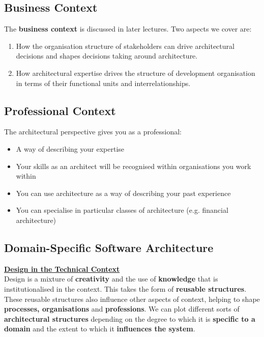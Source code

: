 \documentclass[a4paper]{article}
\begin{document}
\subsection{Business Context}
The \textbf{business context} is discussed in later lectures. Two aspects we cover are:
\begin{enumerate}
\item How the organisation structure of stakeholders can drive architectural decisions and shapes decisions taking around architecture.
\item How architectural expertise drives the structure of development organisation in terms of their functional units and interrelationships.
\end{enumerate}
\subsection{Professional Context}
The architectural perspective gives you as a professional:
\begin{itemize}
\item A way of describing your expertise
\item Your skills as an architect will be recognised within organisations you work within
\item You can use architecture as a way of describing your past experience
\item You can specialise in particular classes of architecture (e.g. financial architecture)
\end{itemize}
\subsection{Domain-Specific Software Architecture}

\underline{\textbf{Design in the Technical Context}}\\
Design is a mixture of \textbf{creativity} and the use of \textbf{knowledge} that is institutionalised in the context. This takes the form of \textbf{reusable structures}. These reusable structures also influence other aspects of context, helping to shape \textbf{processes, organisations} and \textbf{professions}. We can plot different sorts of \textbf{architectural structures} depending on the degree to which it is \textbf{specific to a domain} and the extent to which it \textbf{influences the system}.\\
\end{document}
